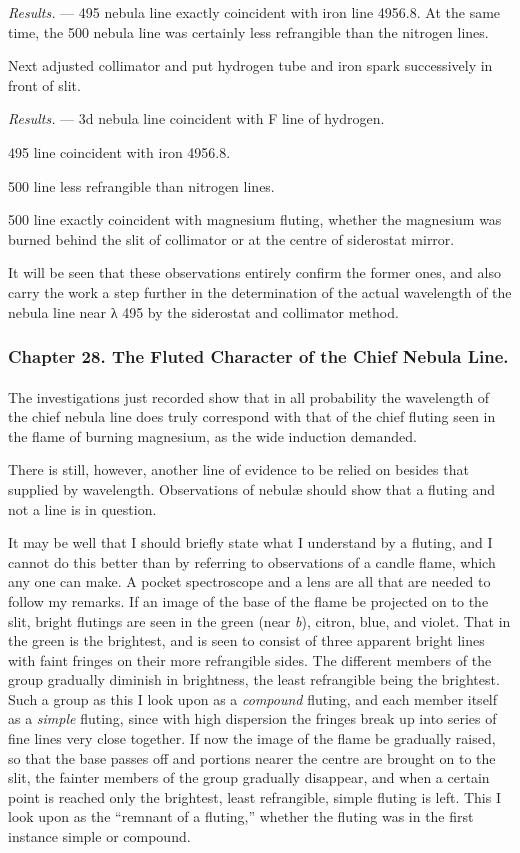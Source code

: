 \documentclass[a4paper, 12pt, oneside, polutonikogreek, english]{article}
\begin{document}
\emph{Results.} --- 495 nebula line exactly coincident with iron line 4956.8. At the same time, the 500 nebula line was certainly less refrangible than the nitrogen lines.

Next adjusted collimator and put hydrogen tube and iron spark successively in front of slit.

\emph{Results.} --- 3d nebula line coincident with F line of hydrogen.

495 line coincident with iron 4956.8.

500 line less refrangible than nitrogen lines.

500 line exactly coincident with magnesium fluting, whether the magnesium was burned behind the slit of collimator or at the centre of siderostat mirror.

It will be seen that these observations entirely confirm the former ones, and also carry the work a step further in the determination of the actual wavelength of the nebula line near λ 495 by the siderostat and collimator method.
\clearpage
\subsubsection{Chapter 28. The Fluted Character of the Chief Nebula Line.}
\paragraph{}
The investigations just recorded show that in all probability the wavelength of the chief nebula line does truly correspond with that of the chief fluting seen in the flame of burning magnesium, as the wide induction demanded.

There is still, however, another line of evidence to be relied on besides that supplied by wavelength. Observations of nebulæ should show that a fluting and not a line is in question.

It may be well that I should briefly state what I understand by a fluting, and I cannot do this better than by referring to observations of a candle flame, which any one can make. A pocket spectroscope and a lens are all that are needed to follow my remarks. If an image of the base of the flame be projected on to the slit, bright flutings are seen in the green (near \emph{b}), citron, blue, and violet. That in the green is the brightest, and is seen to consist of three apparent bright lines with faint fringes on their more refrangible sides. The different members of the group gradually diminish in brightness, the least refrangible being the brightest. Such a group as this I look upon as a \emph{compound} fluting, and each member itself as a \emph{simple} fluting, since with high dispersion the fringes break up into series of fine lines very close together. If now the image of the flame be gradually raised, so that the base passes off and portions nearer the centre are brought on to the slit, the fainter members of the group gradually disappear, and when a certain point is reached only the brightest, least refrangible, simple fluting is left. This I look upon as the ``remnant of a fluting,'' whether the fluting was in the first instance simple or compound.
\end{document}
